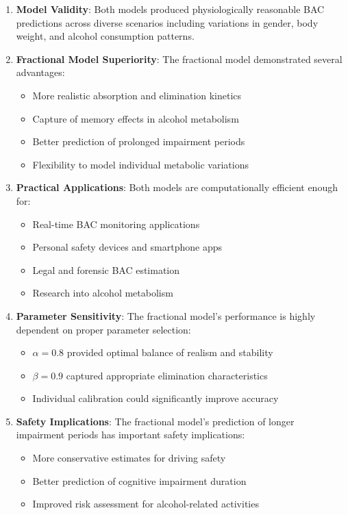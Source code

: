 \documentclass[12pt]{article}
\begin{document}
\begin{enumerate}
    \item \textbf{Model Validity}: Both models produced physiologically reasonable BAC predictions across diverse scenarios including variations in gender, body weight, and alcohol consumption patterns.
    
    \item \textbf{Fractional Model Superiority}: The fractional model demonstrated several advantages:
    \begin{itemize}
        \item More realistic absorption and elimination kinetics
        \item Capture of memory effects in alcohol metabolism
        \item Better prediction of prolonged impairment periods
        \item Flexibility to model individual metabolic variations
    \end{itemize}
    
    \item \textbf{Practical Applications}: Both models are computationally efficient enough for:
    \begin{itemize}
        \item Real-time BAC monitoring applications
        \item Personal safety devices and smartphone apps
        \item Legal and forensic BAC estimation
        \item Research into alcohol metabolism
    \end{itemize}
    
    \item \textbf{Parameter Sensitivity}: The fractional model's performance is highly dependent on proper parameter selection:
    \begin{itemize}
        \item $\alpha = 0.8$ provided optimal balance of realism and stability
        \item $\beta = 0.9$ captured appropriate elimination characteristics
        \item Individual calibration could significantly improve accuracy
    \end{itemize}
    
    \item \textbf{Safety Implications}: The fractional model's prediction of longer impairment periods has important safety implications:
    \begin{itemize}
        \item More conservative estimates for driving safety
        \item Better prediction of cognitive impairment duration
        \item Improved risk assessment for alcohol-related activities
    \end{itemize}
\end{enumerate}
\end{document}
